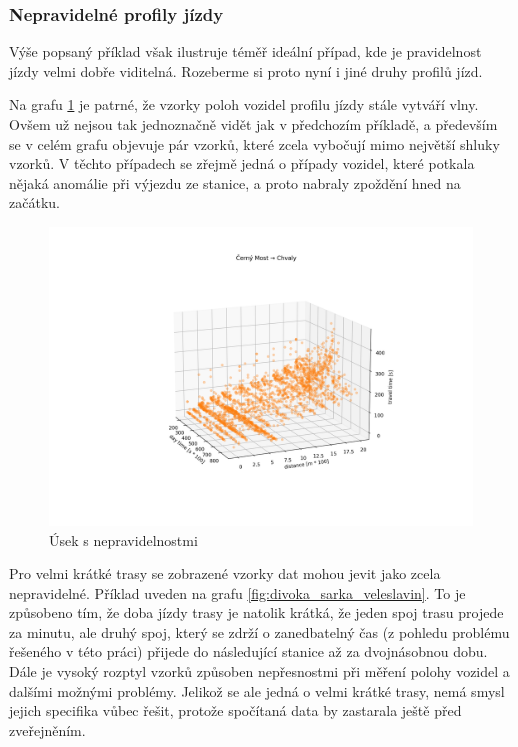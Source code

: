 \subsubsection{Nepravidelné profily jízdy}


Výše popsaný příklad však ilustruje téměř ideální případ, kde je pravidelnost jízdy velmi dobře viditelná. Rozeberme si proto nyní i jiné druhy profilů jízd.


\bigbreak


Na grafu \ref{fig:cerny_most_chvaly} je patrné, že vzorky poloh vozidel profilu jízdy stále vytváří vlny. Ovšem už nejsou tak jednoznačně vidět jak v předchozím příkladě, a především se v celém grafu objevuje pár vzorků, které zcela vybočují mimo největší shluky vzorků. V těchto případech se zřejmě jedná o případy vozidel, které potkala nějaká anomálie při výjezdu ze stanice, a proto nabraly zpoždění hned na začátku.


\begin{figure}
\centering
  \includegraphics[width=\linewidth]{../img/cerny_most_chvaly.png}
  \caption{Úsek s nepravidelnostmi}
  \label{fig:cerny_most_chvaly}
\end{figure}


Pro velmi krátké trasy se zobrazené vzorky dat mohou jevit jako zcela nepravidelné. Příklad uveden na grafu \ref{fig:divoka_sarka_veleslavin}. To je způsobeno tím, že doba jízdy trasy je natolik krátká, že jeden spoj trasu projede za minutu, ale druhý spoj, který se zdrží o zanedbatelný čas (z pohledu problému řešeného v této práci) přijede do následující stanice až za dvojnásobnou dobu. Dále je vysoký rozptyl vzorků způsoben nepřesnostmi při měření polohy vozidel a dalšími možnými problémy. Jelikož se ale jedná o velmi krátké trasy, nemá smysl jejich specifika vůbec řešit, protože spočítaná data by zastarala ještě před zveřejněním.


